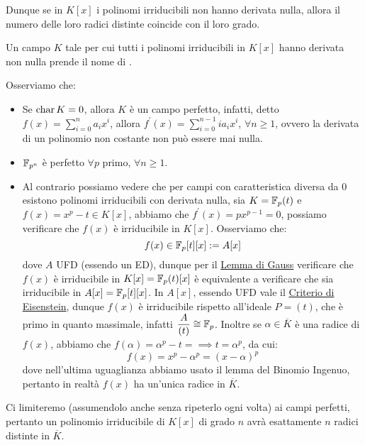 \documentclass[11pt]{scrartcl}
\begin{document}
Dunque se in $K[x]$ i polinomi irriducibili non hanno derivata nulla, allora il numero delle loro radici distinte coincide con il loro grado.

\begin{definition}
    Un campo $K$ tale per cui tutti i polinomi irriducibili in $K[x]$ hanno derivata non nulla prende il nome di .
\end{definition}

\begin{remark}
    Osserviamo che:
    \begin{itemize}
        \item Se $\text{char}\, K = 0$, allora $K$ è un campo perfetto, infatti, detto $f(x) = \sum_{i=0}^n a_ix^i$, allora $f^{\prime}(x) = \sum_{i=0}^{n-1} ia_ix^i$, $\forall n \geq 1$, ovvero la derivata di un polinomio non 
        costante non può essere mai nulla.
        \item $\mathbb{F}_{p^{n}}$ è perfetto $\forall p$ primo, $\forall n \geq 1$.
        \item Al contrario possiamo vedere che per campi con caratteristica diversa da 0 esistono polinomi irriducibili con derivata nulla, sia $K = {\mathbb F}_p(t)$ e $f(x) = x^p - t \in K[x]$, abbiamo che $f^{\prime}(x) = px^{p-1} = 0$,
        possiamo verificare che $f(x)$ è irriducibile in $K[x]$. Osserviamo che:
        \[ f(x) \in {\mathbb F}_p[t][x] := A[x]
            \]
        dove $A$ UFD (essendo un ED), dunque per il \hyperref[gauss]{Lemma di Gauss} verificare che $f(x)$ è irriducibile in $K[x] = {\mathbb F}_p(t)[x]$ è equivalente a verificare che sia irriducibile in $A[x] = {\mathbb F}_p[t][x]$.
        In $A[x]$, essendo UFD vale il \hyperref[eisenstein]{Criterio di Eisenstein}, dunque $f(x)$ è irriducibile rispetto all'ideale $P = (t)$, che è primo in quanto massimale, infatti $\displaystyle\frac{A}{(t)} \cong {\mathbb F}_p$.
        Inoltre se $\alpha \in \overline K$ è una radice di $f(x)$, abbiamo che $f(\alpha) = \alpha^p - t = \implies t = \alpha^p$, da cui:
        \[ f(x) = x^p - \alpha^p = (x - \alpha)^p
            \]
        dove nell'ultima uguaglianza abbiamo usato il lemma del Binomio Ingenuo, pertanto in realtà $f(x)$ ha un'unica radice in $\overline K$.
    \end{itemize}
\end{remark}

Ci limiteremo (assumendolo anche senza ripeterlo ogni volta) ai campi perfetti, pertanto un polinomio irriducibile di $K[x]$ di grado $n$ avrà esattamente $n$ radici distinte in $\overline K$.
\end{document}
